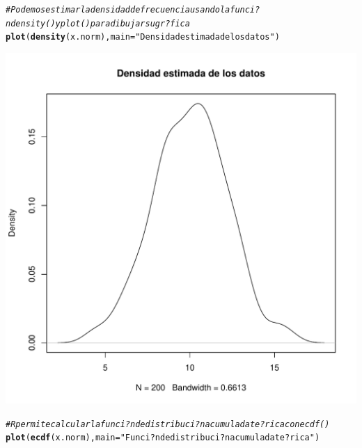 \documentclass[10pt,a4paper]{article}\usepackage[]{graphicx}\usepackage[]{color}
\makeatletter
\def\maxwidth{ %
  \ifdim\Gin@nat@width>\linewidth
    \linewidth
  \else
    \Gin@nat@width
  \fi
}
\newcommand{\hlstr}[1]{\textcolor[rgb]{0.192,0.494,0.8}{#1}}%
\newcommand{\hlcom}[1]{\textcolor[rgb]{0.678,0.584,0.686}{\textit{#1}}}%
\newcommand{\hlstd}[1]{\textcolor[rgb]{0.345,0.345,0.345}{#1}}%
\newcommand{\hlkwc}[1]{\textcolor[rgb]{0.333,0.667,0.333}{#1}}%
\newcommand{\hlkwd}[1]{\textcolor[rgb]{0.737,0.353,0.396}{\textbf{#1}}}%
\newenvironment{kframe}{%
 \def\at@end@of@kframe{}%
 \ifinner\ifhmode%
  \def\at@end@of@kframe{\end{minipage}}%
  \begin{minipage}{\columnwidth}%
 \fi\fi%
 \def\FrameCommand##1{\hskip\@totalleftmargin \hskip-\fboxsep
 \colorbox{shadecolor}{##1}\hskip-\fboxsep
     \hskip-\linewidth \hskip-\@totalleftmargin \hskip\columnwidth}%
 \MakeFramed {\advance\hsize-\width
   \@totalleftmargin\z@ \linewidth\hsize
   \@setminipage}}%
 {\par\unskip\endMakeFramed%
 \at@end@of@kframe}
\newenvironment{knitrout}{}{} %
\makeatother
\begin{document}
\begin{knitrout}
\begin{kframe}\begin{alltt}
\hlcom{# Podemos estimar la densidad de frecuencia usando la funci?n density() y plot() para dibujar su gr?fica }
\hlkwd{plot}\hlstd{(}\hlkwd{density}\hlstd{(x.norm),} \hlkwc{main}\hlstd{=}\hlstr{"Densidad estimada de los datos"}\hlstd{)}
\end{alltt}
\end{kframe}
\includegraphics[width=\maxwidth]{figure/unnamed-chunk-5-2} 
\begin{kframe}\begin{alltt}
\hlcom{# R permite calcular la funci?n de distribuci?n acumulada te?rica con ecdf() }
\hlkwd{plot}\hlstd{(}\hlkwd{ecdf}\hlstd{(x.norm),}\hlkwc{main}\hlstd{=}\hlstr{"Funci?n de distribuci?n acumulada te?rica"}\hlstd{)}
\end{alltt}
\end{kframe}

\end{knitrout}
\end{document}
